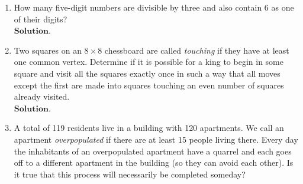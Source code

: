 \documentclass{article}
\theoremstyle{remark}
\begin{document}
\begin{enumerate}
        \item How many five-digit numbers are divisible by three and also contain 6 as one of their digits?
        \\$\textbf{Solution.}$
        

        \item Two squares on an $8 \times 8$ chessboard are called \emph{touching} if they have at least one common vertex. Determine if it is possible for a king to begin in some square and visit all the squares exactly once in such a way that all moves except the first are made into squares touching an even number of squares already visited.
        \\$\textbf{Solution.}$


        \item A total of 119 residents live in a building with 120 apartments. We call an apartment \emph{overpopulated} if there are at least 15 people living there. Every day the inhabitants of an overpopulated apartment have a quarrel and each goes off to a different apartment in the building (so they can avoid each other). Is it true that this process will necessarily be completed someday?
    \end{enumerate}
\end{document}
